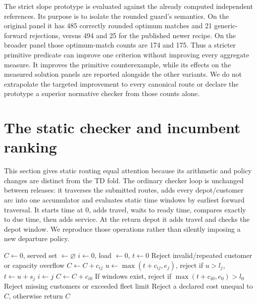 The strict slope prototype is evaluated against the already computed independent references. Its purpose is to isolate the rounded guard's semantics. On the original panel it has 485 correctly rounded optimum matches and 21 generic-forward rejections, versus 494 and 25 for the published newer recipe. On the broader panel those optimum-match counts are 174 and 175. Thus a stricter primitive predicate can improve one criterion without improving every aggregate measure. It improves the primitive counterexample, while its effects on the measured solution panels are reported alongside the other variants. We do not extrapolate the targeted improvement to every canonical route or declare the prototype a superior normative checker from those counts alone.


\section{The static checker and incumbent ranking}\label{sec:static}

This section gives static routing equal attention because its arithmetic and policy changes are distinct from the TD fold. The ordinary checker loop is unchanged between releases: it traverses the submitted routes, adds every depot/customer arc into one accumulator and evaluates static time windows by earliest forward traversal. It starts time at $0$, adds travel, waits to ready time, compares exactly to due time, then adds service. At the return depot it adds travel and checks the depot window. We reproduce those operations rather than silently imposing a new departure policy.

\begin{algorithm}[htbp]
\caption{Static pricing and time-window validation in both releases}\label{alg:static}
\begin{algorithmic}[1]
\State $C\gets0$, served set $\gets\varnothing$
  \State $i\gets0$, load $\gets0$, $t\gets0$
    \State Reject invalid/repeated customer or capacity overflow
    \State $C\gets C+c_{ij}$
      \State $u\gets\max(t+c_{ij},e_j)$, reject if $u>l_j$, $t\gets u+s_j$
    \EndIf
    \State $i\gets j$
  \EndFor
  \State $C\gets C+c_{i0}$
  \State If windows exist, reject if $\max(t+c_{i0},e_0)>l_0$
\EndFor
\State Reject missing customers or exceeded fleet limit
\State Reject a declared cost unequal to $C$, otherwise return $C$
\end{algorithmic}
\end{algorithm}

